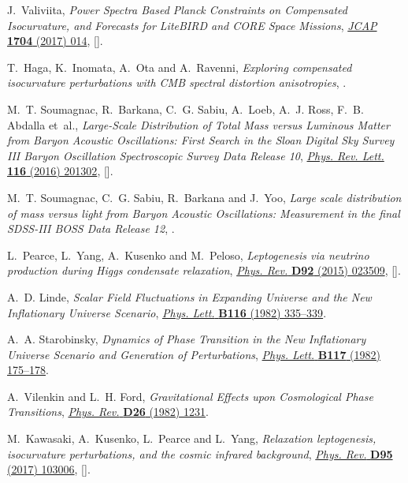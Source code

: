 \documentclass[11pt,a4paper]{article}
\begin{document}
\begin{thebibliography}{10}
J.~Valiviita, \emph{{Power Spectra Based Planck Constraints on Compensated
  Isocurvature, and Forecasts for LiteBIRD and CORE Space Missions}},
  \href{https://doi.org/10.1088/1475-7516/2017/04/014}{\emph{JCAP} {\bfseries
  1704} (2017) 014}, [\href{https://arxiv.org/abs/1701.07039}{{}}].

T.~Haga, K.~Inomata, A.~Ota and A.~Ravenni, \emph{{Exploring compensated
  isocurvature perturbations with CMB spectral distortion anisotropies}},
  \href{https://arxiv.org/abs/1805.08773}{{}}.

M.~T. Soumagnac, R.~Barkana, C.~G. Sabiu, A.~Loeb, A.~J. Ross, F.~B. Abdalla
  et~al., \emph{{Large-Scale Distribution of Total Mass versus Luminous Matter
  from Baryon Acoustic Oscillations: First Search in the Sloan Digital Sky
  Survey III Baryon Oscillation Spectroscopic Survey Data Release 10}},
  \href{https://doi.org/10.1103/PhysRevLett.116.201302}{\emph{Phys. Rev. Lett.}
  {\bfseries 116} (2016) 201302},
  [\href{https://arxiv.org/abs/1602.01839}{{}}].

M.~T. Soumagnac, C.~G. Sabiu, R.~Barkana and J.~Yoo, \emph{{Large scale
  distribution of mass versus light from Baryon Acoustic Oscillations:
  Measurement in the final SDSS-III BOSS Data Release 12}},
  \href{https://arxiv.org/abs/1802.10368}{{}}.

L.~Pearce, L.~Yang, A.~Kusenko and M.~Peloso, \emph{{Leptogenesis via neutrino
  production during Higgs condensate relaxation}},
  \href{https://doi.org/10.1103/PhysRevD.92.023509}{\emph{Phys. Rev.}
  {\bfseries D92} (2015) 023509},
  [\href{https://arxiv.org/abs/1505.02461}{{}}].

A.~D. Linde, \emph{{Scalar Field Fluctuations in Expanding Universe and the New
  Inflationary Universe Scenario}},
  \href{https://doi.org/10.1016/0370-2693(82)90293-3}{\emph{Phys. Lett.}
  {\bfseries B116} (1982) 335--339}.

A.~A. Starobinsky, \emph{{Dynamics of Phase Transition in the New Inflationary
  Universe Scenario and Generation of Perturbations}},
  \href{https://doi.org/10.1016/0370-2693(82)90541-X}{\emph{Phys. Lett.}
  {\bfseries B117} (1982) 175--178}.

A.~Vilenkin and L.~H. Ford, \emph{{Gravitational Effects upon Cosmological
  Phase Transitions}},
  \href{https://doi.org/10.1103/PhysRevD.26.1231}{\emph{Phys. Rev.} {\bfseries
  D26} (1982) 1231}.

M.~Kawasaki, A.~Kusenko, L.~Pearce and L.~Yang, \emph{{Relaxation leptogenesis,
  isocurvature perturbations, and the cosmic infrared background}},
  \href{https://doi.org/10.1103/PhysRevD.95.103006}{\emph{Phys. Rev.}
  {\bfseries D95} (2017) 103006},
  [\href{https://arxiv.org/abs/1701.02175}{{}}].

\end{thebibliography}\endgroup
\end{document}
